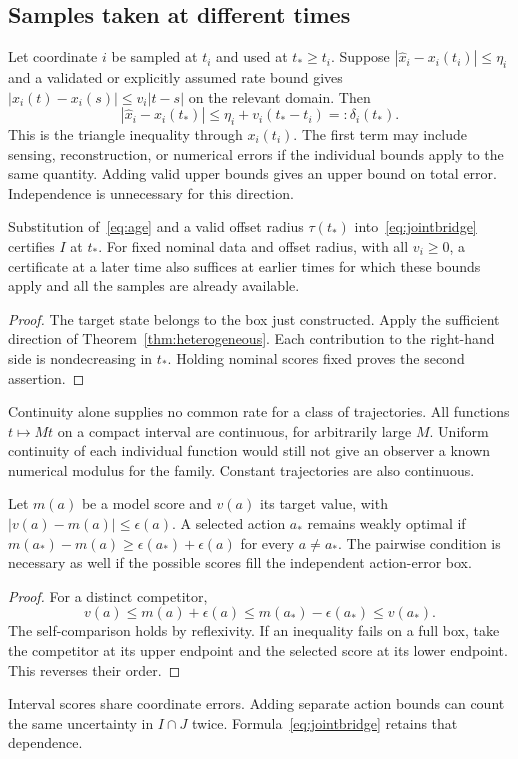 \subsection{Samples taken at different times}
Let coordinate $i$ be sampled at $t_i$ and used at $t_*\ge t_i$. Suppose $|\widehat x_i-x_i(t_i)|\le\eta_i$ and a validated or explicitly assumed rate bound gives $|x_i(t)-x_i(s)|\le v_i|t-s|$ on the relevant domain. Then
\begin{equation}\label{eq:age}
|\widehat x_i-x_i(t_*)|\le\eta_i+v_i(t_*-t_i)=:\delta_i(t_*).
\end{equation}
This is the triangle inequality through $x_i(t_i)$. The first term may include sensing, reconstruction, or numerical errors if the individual bounds apply to the same quantity. Adding valid upper bounds gives an upper bound on total error. Independence is unnecessary for this direction.

\begin{corollary}\label{cor:deadlinecertificate}
Substitution of~\eqref{eq:age} and a valid offset radius $\tau(t_*)$ into~\eqref{eq:jointbridge} certifies $I$ at $t_*$. For fixed nominal data and offset radius, with all $v_i\ge0$, a certificate at a later time also suffices at earlier times for which these bounds apply and all the samples are already available.
\end{corollary}
\begin{proof}
The target state belongs to the box just constructed. Apply the sufficient direction of Theorem~\ref{thm:heterogeneous}. Each contribution to the right-hand side is nondecreasing in $t_*$. Holding nominal scores fixed proves the second assertion.
\end{proof}
Continuity alone supplies no common rate for a class of trajectories. All functions $t\mapsto Mt$ on a compact interval are continuous, for arbitrarily large $M$. Uniform continuity of each individual function would still not give an observer a known numerical modulus for the family. Constant trajectories are also continuous.

\begin{proposition}\label{prop:actionmargin}
Let $m(a)$ be a model score and $v(a)$ its target value, with $|v(a)-m(a)|\le\epsilon(a)$. A selected action $a_*$ remains weakly optimal if $m(a_*)-m(a)\ge\epsilon(a_*)+\epsilon(a)$ for every $a\ne a_*$. The pairwise condition is necessary as well if the possible scores fill the independent action-error box.
\end{proposition}
\begin{proof}
For a distinct competitor,
\[
v(a)\le m(a)+\epsilon(a)\le m(a_*)-\epsilon(a_*)\le v(a_*).
\]
The self-comparison holds by reflexivity. If an inequality fails on a full box, take the competitor at its upper endpoint and the selected score at its lower endpoint. This reverses their order.
\end{proof}
Interval scores share coordinate errors. Adding separate action bounds can count the same uncertainty in $I\cap J$ twice. Formula~\eqref{eq:jointbridge} retains that dependence.

